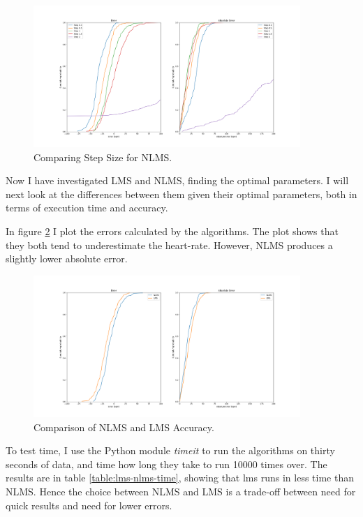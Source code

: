 \documentclass[12pt,a4paper,twoside,openright]{report}
\begin{document}
\begin{figure}[H]
	\centerline{\includegraphics[width=0.9\textwidth]{figs/nlms-steps-error-medium-noise.png}}
	\caption{Comparing Step Size for NLMS.}
	\label{fig:nlms-medium-step}
\end{figure}

Now I have investigated LMS and NLMS, finding the optimal parameters. I
will next look at the differences between them given their optimal
parameters, both in terms of execution time and accuracy.

In figure \ref{fig:lms-nlms-validity} I plot the errors calculated by the
algorithms. The plot shows that they both tend to underestimate the
heart-rate. However, NLMS produces a slightly lower absolute error. 

\begin{figure}[H]
	\centerline{\includegraphics[width=0.9\textwidth]{figs/nlms-lms-validity.png}}
	\caption{Comparison of NLMS and LMS Accuracy.}
	\label{fig:lms-nlms-validity}
\end{figure}

To test time, I use the Python module \emph{timeit} to run the algorithms on
thirty seconds of data, and time how long they take to run 10000 times over.
The results are in table \ref{table:lms-nlms-time}, showing that lms runs in
less time than NLMS. Hence the choice between NLMS and LMS is a trade-off
between need for quick results and need for lower errors.
\end{document}
